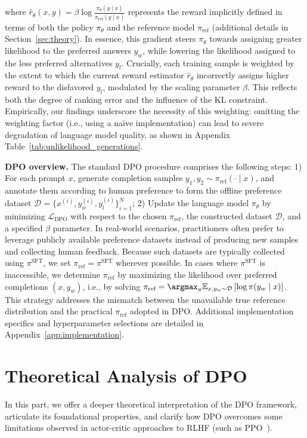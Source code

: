 where $\hat{r}_\theta(x, y) = \beta \log \frac{\pi_\theta(y \mid x)}{\pi_\text{ref}(y \mid x)}$ represents the reward implicitly defined in terms of both the policy $\pi_\theta$ and the reference model $\pi_\text{ref}$ (additional details in Section~\ref{sec:theory}). In essence, this gradient steers $\pi_\theta$ towards assigning greater likelihood to the preferred answers $y_w$, while lowering the likelihood assigned to the less preferred alternatives $y_l$. Crucially, each training sample is weighted by the extent to which the current reward estimator $\hat{r}_\theta$ incorrectly assigns higher reward to the disfavored $y_l$, modulated by the scaling parameter $\beta$. This reflects both the degree of ranking error and the influence of the KL constraint. Empirically, our findings underscore the necessity of this weighting: omitting the weighting factor (i.e., using a na\"ive implementation) can lead to severe degradation of language model quality, as shown in Appendix Table~\ref{tab:unlikelihood_generations}.

\textbf{DPO overview.} The standard DPO procedure comprises the following steps: 1) For each prompt $x$, generate completion samples $y_1, y_2 \sim \pi_\text{ref}(\cdot \mid x)$, and annotate them according to human preference to form the offline preference dataset $\mathcal{D} = \{x^{(i)}, y_w^{(i)}, y_l^{(i)}\}_{i=1}^N$; 2) Update the language model $\pi_\theta$ by minimizing $\mathcal{L}_\text{DPO}$ with respect to the chosen $\pi_\text{ref}$, the constructed dataset $\mathcal{D}$, and a specified $\beta$ parameter. 
In real-world scenarios, practitioners often prefer to leverage publicly available preference datasets instead of producing new samples and collecting human feedback. Because such datasets are typically collected using $\pi^\text{SFT}$, we set $\pi_\text{ref} = \pi^\text{SFT}$ wherever possible. In cases where $\pi^\text{SFT}$ is inaccessible, we determine $\pi_\text{ref}$ by maximizing the likelihood over preferred completions ${(x, y_w)}$, i.e., by solving ${\pi_\text{ref} = \argmax_{\pi}\mathbb{E}_{x, y_w \sim \mathcal{D}}\left[\log \pi(y_w \mid x)\right]}$. This strategy addresses the mismatch between the unavailable true reference distribution and the practical $\pi_\text{ref}$ adopted in DPO. Additional implementation specifics and hyperparameter selections are detailed in Appendix~\ref{app:implementation}.

\section{Theoretical Analysis of DPO} In this part, we offer a deeper theoretical interpretation of the DPO framework, articulate its foundational properties, and clarify how DPO overcomes some limitations observed in actor-critic approaches to RLHF (such as PPO~\cite{schulman2017proximal}).

